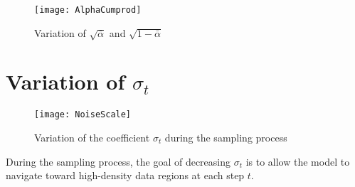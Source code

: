 \begin{figure}[h]
	\texttt{[image: AlphaCumprod]}
	\label{fig:AlphaCumprod}
	\caption{Variation of $\sqrt{\bar{\alpha}}$ and $\sqrt{1 - \bar{\alpha}}$}
\end{figure}


\section{Variation of $\sigma_t$}
\label{appendix:Appendix1:NoiseScale}
\vspace{-10pt}
\begin{figure}[h]
	\texttt{[image: NoiseScale]}
	\label{fig:NoiseScale}
	\caption{Variation of the coefficient $\sigma_t$ during the sampling process}
\end{figure}
\vspace{-10pt}
During the sampling process, the goal of decreasing $\sigma_t$ is to allow the model to navigate toward high-density data regions at each step $t$.

